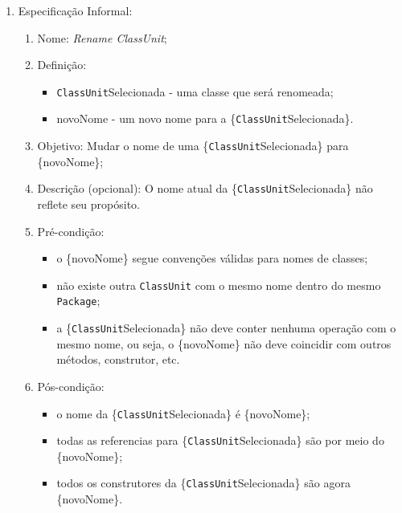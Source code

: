 \begin{enumerate}
	\item Especificação Informal:
		\begin{enumerate}
			\item Nome: \textit{Rename ClassUnit};
			\item Definição:
			    \begin{itemize}
			        \item \texttt{ClassUnit}Selecionada - uma classe que será renomeada;
			        \item novoNome - um novo nome para a \{\texttt{ClassUnit}Selecionada\}.
			    \end{itemize}
			\item Objetivo: Mudar o nome de uma \{\texttt{ClassUnit}Selecionada\} para \{novoNome\};
			\item Descrição (opcional): O nome atual da \{\texttt{ClassUnit}Selecionada\} não reflete seu propósito.
			\item Pré-condição:
			    \begin{itemize}
			        \item o \{novoNome\} segue convenções válidas para nomes de classes;
			        \item não existe outra \texttt{ClassUnit} com o mesmo nome dentro do mesmo \texttt{Package};
			        \item a \{\texttt{ClassUnit}Selecionada\} não deve conter nenhuma operação com o mesmo nome, ou seja, o \{novoNome\} não deve coincidir com outros métodos, construtor, etc. 
			    \end{itemize}
			\item Pós-condição:
			    \begin{itemize}
			        \item o nome da \{\texttt{ClassUnit}Selecionada\} é \{novoNome\};
			        \item todas as referencias para \{\texttt{ClassUnit}Selecionada\} são por meio do \{novoNome\};
			        \item todos os construtores da \{\texttt{ClassUnit}Selecionada\} são agora \{novoNome\}.
			    \end{itemize}

\end{enumerate}
\end{enumerate}
